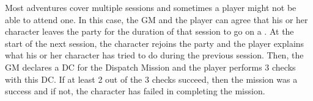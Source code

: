 %
\vfill
%
Most adventures cover multiple sessions and sometimes a player might not be able to attend one.
In this case, the GM and the player can agree that his or her character leaves the party for the duration of that session to go on a .
At the start of the next session, the character rejoins the party and the player explains what his or her character has tried to do during the previous session.
Then, the GM declares a DC for the Dispatch Mission and the player performs 3 checks with this DC.
If at least 2 out of the 3 checks succeed, then the mission was a success and if not, the character has failed in completing the mission.
%
\clearpage